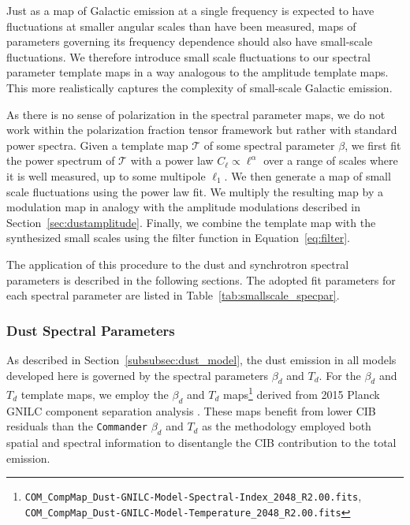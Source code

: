\documentclass[twocolumn]{aastex631}
\begin{document}
Just as a map of Galactic emission at a single frequency is expected to have fluctuations at smaller angular scales than have been measured, maps of parameters governing its frequency dependence should also have small-scale fluctuations. We therefore introduce small scale fluctuations to our spectral parameter template maps in a way analogous to the amplitude template maps. This more realistically captures the complexity of small-scale Galactic emission.

As there is no sense of polarization in the spectral parameter maps, we do not work within the polarization fraction tensor framework but rather with standard power spectra. Given a template map $\mathcal{T}$ of some spectral parameter $\beta$, we first fit the power spectrum of $\mathcal{T}$ with a power law $C_\ell \propto \ell^\alpha$ over a range of scales where it is well measured, up to some multipole $\ell_1$. We then generate a map of small scale fluctuations using the power law fit. We multiply the resulting map by a modulation map in analogy with the amplitude modulations described in Section~\ref{sec:dustamplitude}. Finally, we combine the template map with the synthesized small scales using the filter function in Equation~\ref{eq:filter}.

The application of this procedure to the dust and synchrotron spectral parameters is described in the following sections. The adopted fit parameters for each spectral parameter are listed in Table~\ref{tab:smallscale_specpar}.

\subsubsection{Dust Spectral Parameters}\label{subsec:dust_spec_params}
As described in Section~\ref{subsubsec:dust_model}, the dust emission in all models developed here is governed by the spectral parameters $\beta_d$ and $T_d$. For the $\beta_d$ and $T_d$ template maps, we employ the $\beta_d$ and $T_d$ maps\footnote{\texttt{COM\_CompMap\_Dust-GNILC-Model-Spectral-Index\_2048\_R2.00.fits}, \texttt{COM\_CompMap\_Dust-GNILC-Model-Temperature\_2048\_R2.00.fits}} derived from 2015 Planck GNILC component separation analysis \citep{planck2016-XLVIII}. These maps benefit from lower CIB residuals than the \texttt{Commander} $\beta_d$ and $T_d$ as the methodology employed both spatial and spectral information to disentangle the CIB contribution to the total emission.
\end{document}
